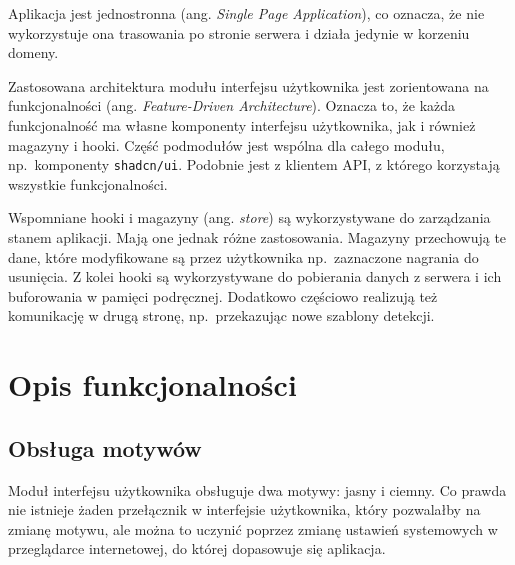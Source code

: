 \begin{figure-}
    \caption{Modularny podział warstwy prezentacyjnej z wyodrębnieniem domen funkcjonalnych.}\label{fig:modular_architecture_diagram}
\end{figure-}
Aplikacja jest jednostronna (ang. \textit{Single Page Application}), co oznacza, że nie wykorzystuje ona trasowania po stronie serwera i działa jedynie w korzeniu domeny.

Zastosowana architektura modułu interfejsu użytkownika jest zorientowana na funkcjonalności (ang. \textit{Feature-Driven Architecture}). Oznacza to, że każda funkcjonalność ma własne komponenty interfejsu użytkownika, jak i również magazyny i hooki. Część podmodułów jest wspólna dla całego modułu, np.\ komponenty \texttt{shadcn/ui}. Podobnie jest z klientem API, z którego korzystają wszystkie funkcjonalności. 

Wspomniane hooki i magazyny (ang. \textit{store}) są wykorzystywane do zarządzania stanem aplikacji. Mają one jednak różne zastosowania. Magazyny przechowują te dane, które modyfikowane są przez użytkownika np.\ zaznaczone nagrania do usunięcia. Z kolei hooki są wykorzystywane do pobierania danych z serwera i ich buforowania w pamięci podręcznej. Dodatkowo częściowo realizują też komunikację w drugą stronę, np.\ przekazując nowe szablony detekcji. 

\section{Opis funkcjonalności}

\subsection{Obsługa motywów}
Moduł interfejsu użytkownika obsługuje dwa motywy: jasny i ciemny. Co prawda nie istnieje żaden przełącznik w interfejsie użytkownika, który pozwalałby na zmianę motywu, ale można to uczynić poprzez zmianę ustawień systemowych w przeglądarce internetowej, do której dopasowuje się aplikacja.

